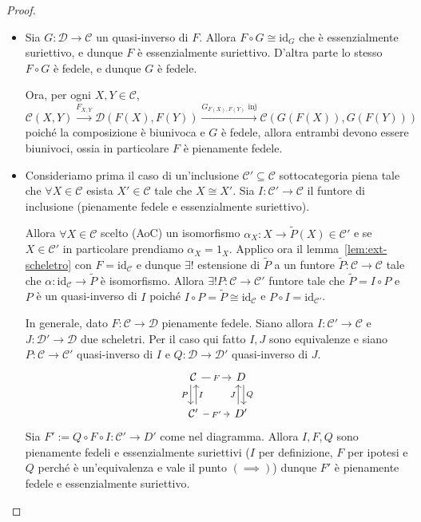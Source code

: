 \begin{proof}\( \)
\begin{itemize}
    \item[\(\implies \)] Sia \(G : \mathcal{D} \to \mathcal{C}\) un quasi-inverso di \(F\). Allora
        \(F \circ G \cong \mathrm{id}_G\) che è essenzialmente suriettivo, e
        dunque \(F\) è essenzialmente suriettivo. D'altra parte lo stesso \(F
        \circ G\) è fedele, e dunque \(G\) è fedele.
        
        Ora, per ogni \(X, Y \in \mathcal{C}\),
        \[
          \mathcal{C}{(X, Y)} \overset{F_{X,Y} }{\to } \mathcal{D}{(F{(X)},
          F{(Y)})} \overset{G_{F{(X)}, F{(Y)}}  \text{ inj}}{\to}
          \mathcal{C}{(G{(F{(X)})}, G{(F{(Y)})})}
        \]
        poiché la composizione è biunivoca e \(G\) è fedele, allora entrambi
        devono essere biunivoci, ossia in particolare \(F\) è pienamente fedele.
    \item[\(\impliedby \)] Consideriamo prima il caso di un'inclusione \(\mathcal{C}' \subseteq \mathcal{C} \) sottocategoria piena tale che \(\forall X \in \mathcal{C}\) esista \(X' \in \mathcal{C}\) tale che \(X \cong X'\). 
        Sia \(I : \mathcal{C}' \to \mathcal{C}\) il funtore di inclusione (pienamente fedele e
        essenzialmente suriettivo).

        Allora \(\forall X \in \mathcal{C}\) scelto (AoC) un
        isomorfismo \(\alpha_X : X \to \tilde{P}{(X)} \in \mathcal{C}'\) e se \(X \in 
        \mathcal{C}'\) in particolare prendiamo \(\alpha_X = 1_X\). Applico ora il
        lemma~\ref{lem:ext-scheletro} con \(F = \mathrm{id}_\mathcal{C}\) e dunque \(\exists !\) estensione di \(\tilde{P}\) a un funtore \(\tilde{P} : \mathcal{C} \to \mathcal{C}\) tale che \(\alpha : \mathrm{id}_\mathcal{C} \to \tilde{P}\) è isomorfismo. Allora \(\exists ! P : \mathcal{C} \to \mathcal{C}'\) funtore tale che \(\tilde{P} = I \circ P\) e \(P\) è un quasi-inverso di \(I\) poiché \(I \circ P = \tilde{P} \cong \mathrm{id}_\mathcal{C}\) e \(P \circ I = \mathrm{id}_{\mathcal{C}'}\).

        In generale, dato \(F : \mathcal{C} \to \mathcal{D}\) pienamente fedele. Siano allora \(
        I : \mathcal{C}' \to \mathcal{C}\) e \(J : \mathcal{D}' \to \mathcal{D}\) due scheletri. Per il caso qui fatto
        \(I, J\) sono equivalenze e siano \(P : \mathcal{C}\to \mathcal{C}'\)
        quasi-inverso di \(I\) e \(Q : \mathcal{D} \to \mathcal{D}'\) quasi-inverso di \(J\).
\[\begin{tikzcd}
	\mathcal{C} & D \\
	{\mathcal{C}'} & {D'}
	\arrow["F"{description}, from=1-1, to=1-2]
	\arrow["P"', shift right, from=1-1, to=2-1]
	\arrow["Q", shift left, from=1-2, to=2-2]
	\arrow["I"', shift right, from=2-1, to=1-1]
	\arrow["{F'}"{description}, from=2-1, to=2-2]
	\arrow["J", shift left, from=2-2, to=1-2]
\end{tikzcd}\]
    Sia \(F' := Q \circ F \circ I : \mathcal{C}' \to D'\) come nel diagramma. Allora \(
    I, F, Q\) sono pienamente fedeli e essenzialmente suriettivi (\(I\) per
    definizione, \(F\) per ipotesi e \(Q\) perché è un'equivalenza e vale il
    punto \({(\implies )}\)) dunque \(
    F'\) è pienamente fedele e essenzialmente suriettivo.


\end{itemize}
\end{proof}
